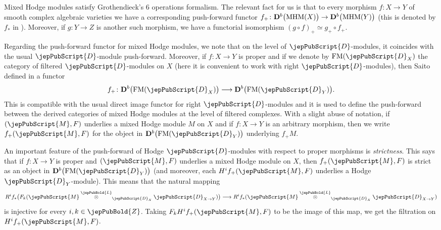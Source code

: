 Mixed Hodge modules satisfy Grothendieck's 6 operations formalism. The relevant fact for us is that to every morphism $f\colon X\to Y$ of 
smooth complex algebraic varieties we have a corresponding push-forward functor $f_+\colon {\bf D}^b\big({\rm MHM}(X)\big)\rightarrow {\bf D}^b\big({\rm MHM}(Y)\big)$
(this is denoted by $f_*$ in \cite{Saito-MHM}). Moreover, if
$g\colon Y\to Z$ is another such morphism, we have a functorial isomorphism $(g\circ f)_+\simeq g_+\circ f_+$. 

Regarding the push-forward functor for mixed Hodge modules, we note that on the level of $\jepPubScript{D}$-modules, it coincides with the usual $\jepPubScript{D}$-module push-forward. 
Moreover, if $f\colon X\to Y$ is proper and if we denote by ${\rm FM}(\jepPubScript{D}_X)$ the category of filtered $\jepPubScript{D}$-modules on $X$ (here it is convenient to work with right $\jepPubScript{D}$-modules), then
Saito defined in \cite{Saito-MHP} a functor
$$f_+ \colon {\bf D}^b \big({\rm FM}(\jepPubScript{D}_X)\big) \longrightarrow {\bf D}^b \big({\rm FM}(\jepPubScript{D}_Y)\big).$$
This is compatible with the usual direct image functor for right $\jepPubScript{D}$-modules and it is used to define
the push-forward between the derived categories of mixed Hodge modules at the level of filtered complexes. 
With a slight abuse of notation, if $(\jepPubScript{M},F)$ underlies a mixed Hodge module $M$ on $X$ and if $f\colon X\to Y$
is an arbitrary morphism, then we write $f_+(\jepPubScript{M},F)$ for the object in ${\bf D}^b\big({\rm FM}(\jepPubScript{D}_Y)\big)$ underlying $f_+M$.


An important feature of the push-forward of Hodge $\jepPubScript{D}$-modules with respect to proper morphisms is \emph{strictness}. 
This says that if $f\colon X\to Y$ is proper and $(\jepPubScript{M},F)$ underlies a mixed Hodge module on $X$, then 
$f_+ (\jepPubScript{M}, F)$ is strict 
as an object in ${\bf D}^b \big({\rm FM}(\jepPubScript{D}_Y)\big)$ (and moreover, each $H^i f_+ (\jepPubScript{M}, F)$ underlies a Hodge $\jepPubScript{D}_Y$-module). 
This means that the natural mapping 
\begin{equation}\label{strictness_formula}
R^i f_* \big(F_k (\jepPubScript{M} \overset{\jepPubBold{L}}{\otimes}_{\jepPubScript{D}_X} \jepPubScript{D}_{X\to Y}) \big) \longrightarrow 
R^i f_* (\jepPubScript{M} \overset{\jepPubBold{L}}{\otimes}_{\jepPubScript{D}_X} \jepPubScript{D}_{X\to Y})
\end{equation}
is injective for every $i, k\in\jepPubBold{Z}$. 
Taking $F_kH^if_+(\jepPubScript{M},F)$ to be the image of this map, we get the filtration on $H^if_+(\jepPubScript{M},F)$.

